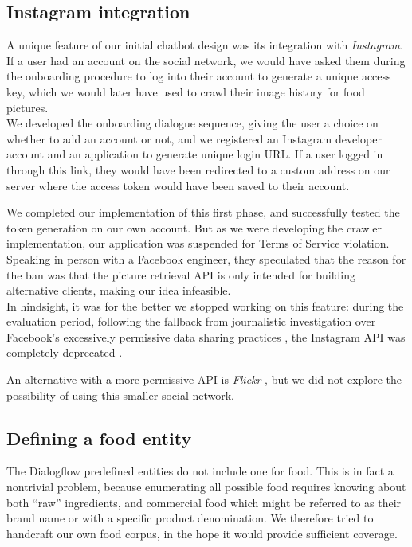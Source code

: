 \subsection{Instagram integration}
A unique feature of our initial chatbot design was its integration with \textit{Instagram}. If a user had an account on the social network, we would have asked them during the onboarding procedure to log into their account to generate a unique access key, which we would later have used to crawl their image history for food pictures.\\
We developed the onboarding dialogue sequence, giving the user a choice on whether to add an account or not, and we registered an Instagram developer account and an application to generate unique login URL. If a user logged in through this link, they would have been redirected to a custom address on our server where the access token would have been saved to their account.

We completed our implementation of this first phase, and successfully tested the token generation on our own account. But as we were developing the crawler implementation, our application was suspended for Terms of Service violation. Speaking in person with a Facebook engineer, they speculated that the reason for the ban was that the picture retrieval API is only intended for building alternative clients, making our idea infeasible. \\
In hindsight, it was for the better we stopped working on this feature: during the evaluation period, following the fallback from journalistic investigation over Facebook's excessively permissive data sharing practices \cite{cambridgeanalytica}, the Instagram API was completely deprecated \cite{instagramdeprecated}.

An alternative with a more permissive API is \textit{Flickr} \cite{flickr}, but we did not explore the possibility of using this smaller social network.
\subsection{Defining a food entity}
The Dialogflow predefined entities do not include one for food. This is in fact a nontrivial problem, because enumerating all possible food requires knowing about both ``raw'' ingredients, and commercial food which might be referred to as their brand name or with a specific product denomination. We therefore tried to handcraft our own food corpus, in the hope it would provide sufficient coverage.

